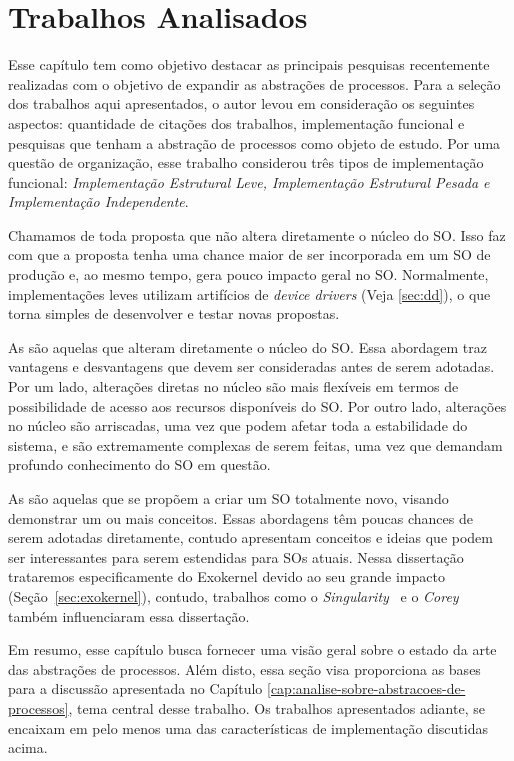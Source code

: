 \chapter{Trabalhos Analisados}
\label{cap:trabalhos-analisados}

Esse capítulo tem como objetivo destacar as principais pesquisas recentemente
realizadas com o objetivo de expandir as abstrações de processos. Para a
seleção dos trabalhos aqui apresentados, o autor levou em consideração os
seguintes aspectos: quantidade de citações dos trabalhos, implementação
funcional e pesquisas que tenham a abstração de processos como objeto de
estudo. Por uma questão de organização, esse trabalho considerou três tipos de
implementação funcional: \textit{Implementação Estrutural Leve, Implementação
Estrutural Pesada e Implementação Independente}.

Chamamos de  toda proposta que não
altera diretamente o núcleo do SO. Isso faz com que a proposta tenha uma chance
maior de ser incorporada em um SO de produção e, ao mesmo tempo, gera pouco
impacto geral no SO. Normalmente, implementações leves utilizam artifícios de
\emph{device drivers} (Veja \ref{sec:dd}), o que torna simples de desenvolver e
testar novas propostas.

As  são aquelas que alteram
diretamente o núcleo do SO. Essa abordagem traz vantagens e desvantagens que
devem ser consideradas antes de serem adotadas. Por um lado, alterações diretas
no núcleo são mais flexíveis em termos de possibilidade de acesso aos recursos
disponíveis do SO. Por outro lado, alterações no núcleo são arriscadas, uma vez
que podem afetar toda a estabilidade do sistema, e são extremamente complexas
de serem feitas, uma vez que demandam profundo conhecimento do SO em questão.

As  são aquelas que se propõem a
criar um SO totalmente novo, visando demonstrar um ou mais conceitos. Essas
abordagens têm poucas chances de serem adotadas diretamente, contudo apresentam
conceitos e ideias que podem ser interessantes para serem estendidas para SOs
atuais. Nessa dissertação trataremos especificamente do Exokernel devido ao seu
grande impacto (Seção~\ref{sec:exokernel}), contudo, trabalhos como o
\emph{Singularity}~\citep{aiken} e o \emph{Corey}~\citep{corey} também
influenciaram essa dissertação.

Em resumo, esse capítulo busca fornecer uma visão geral sobre o estado da arte
das abstrações de processos. Além disto, essa seção visa proporciona as bases
para a discussão apresentada no Capítulo
\ref{cap:analise-sobre-abstracoes-de-processos}, tema central desse trabalho.
Os trabalhos apresentados adiante, se encaixam em pelo menos uma das
características de implementação discutidas acima.

